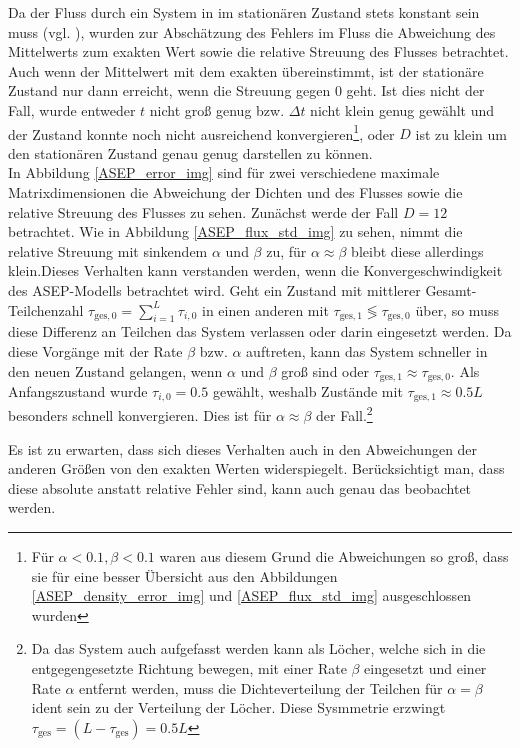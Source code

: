 \documentclass[10pt,a4paper]{report}
\begin{document}
Da der Fluss durch ein System in im stationären Zustand stets konstant sein muss (vgl. \cite{ASEP}), wurden zur Abschätzung des Fehlers im Fluss die Abweichung des Mittelwerts zum exakten Wert sowie die relative Streuung des Flusses betrachtet. Auch wenn der Mittelwert mit dem exakten übereinstimmt, ist der stationäre Zustand nur dann erreicht, wenn die Streuung gegen $0$ geht. Ist dies nicht der Fall, wurde entweder $t$ nicht groß genug bzw. $\Delta t$ nicht klein genug gewählt und der Zustand konnte noch nicht ausreichend konvergieren\footnote{Für $\alpha<0.1,\beta<0.1$ waren aus diesem Grund die Abweichungen so groß, dass sie für eine besser Übersicht aus den Abbildungen \ref{ASEP_density_error_img} und \ref{ASEP_flux_std_img} ausgeschlossen wurden}, oder $D$ ist zu klein um den stationären Zustand genau genug darstellen zu können.\\

In Abbildung \ref{ASEP_error_img} sind für zwei verschiedene maximale Matrixdimensionen die Abweichung der Dichten und des Flusses sowie die relative Streuung des Flusses zu sehen. Zunächst werde der Fall $D=12$ betrachtet. Wie in Abbildung \ref{ASEP_flux_std_img} zu sehen, nimmt die relative Streuung mit sinkendem $\alpha$ und $\beta$ zu, für $\alpha\approx\beta$ bleibt diese allerdings klein.Dieses Verhalten kann verstanden werden, wenn die Konvergeschwindigkeit des ASEP-Modells betrachtet wird. Geht ein Zustand mit mittlerer Gesamt-Teilchenzahl $\tau_{\text{ges},0}=\sum_{i=1}^L\tau_{i,0}$ in einen anderen mit $\tau_{\text{ges},1}\lessgtr\tau_{\text{ges},0}$ über, so muss diese Differenz an Teilchen das System verlassen oder darin eingesetzt werden. Da diese Vorgänge mit der Rate $\beta$ bzw. $\alpha$ auftreten, kann das System schneller in den neuen Zustand gelangen, wenn $\alpha$ und $\beta$ groß sind oder $\tau_{\text{ges},1}\approx\tau_{\text{ges},0}$. Als Anfangszustand wurde $\tau_{i,0}=0.5$ gewählt, weshalb Zustände mit $\tau_{\text{ges},1}\approx 0.5L$ besonders schnell konvergieren. Dies ist für $\alpha\approx\beta$ der Fall.\footnote{Da das System auch aufgefasst werden kann als Löcher, welche sich in die entgegengesetzte Richtung bewegen, mit einer Rate $\beta$ eingesetzt und einer Rate $\alpha$ entfernt werden\cite{ASEP}, muss die Dichteverteilung der Teilchen für $\alpha=\beta$ ident sein zu der Verteilung der Löcher. Diese Sysmmetrie erzwingt $\tau_{\text{ges}}=(L-\tau_{\text{ges}})=0.5L$ }


 Es ist zu erwarten, dass sich dieses Verhalten auch in den Abweichungen der anderen Größen von den exakten Werten widerspiegelt. Berücksichtigt man, dass diese absolute anstatt relative Fehler sind, kann auch genau das beobachtet werden.
 
\end{document}

